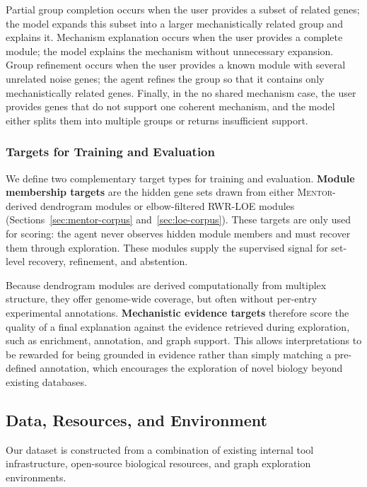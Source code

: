 \documentclass[thesis,letterpaper,12pt]{utthesis}
\begin{document}
Partial group completion occurs when the user provides a subset of related genes; the model expands this subset into a larger mechanistically related group and explains it. Mechanism explanation occurs when the user provides a complete module; the model explains the mechanism without unnecessary expansion. Group refinement occurs when the user provides a known module with several unrelated noise genes; the agent refines the group so that it contains only mechanistically related genes. Finally, in the no shared mechanism case, the user provides genes that do not support one coherent mechanism, and the model either splits them into multiple groups or returns insufficient support.

\subsubsection{Targets for Training and Evaluation}
We define two complementary target types for training and evaluation. \textbf{Module membership targets} are the hidden gene sets drawn from either \textsc{Mentor}-derived dendrogram modules or elbow-filtered RWR-LOE modules (Sections~\ref{sec:mentor-corpus} and~\ref{sec:loe-corpus}). These targets are only used for scoring: the agent never observes hidden module members and must recover them through exploration. These modules supply the supervised signal for set-level recovery, refinement, and abstention.

Because dendrogram modules are derived computationally from multiplex structure, they offer genome-wide coverage, but often without per-entry experimental annotations. \textbf{Mechanistic evidence targets} therefore score the quality of a final explanation against the evidence retrieved during exploration, such as enrichment, annotation, and graph support. This allows interpretations to be rewarded for being grounded in evidence rather than simply matching a pre-defined annotation, which encourages the exploration of novel biology beyond existing databases.

\subsection{Data, Resources, and Environment}\label{sec:data}
Our dataset is constructed from a combination of existing internal tool infrastructure, open-source biological resources, and graph exploration environments.
\end{document}
